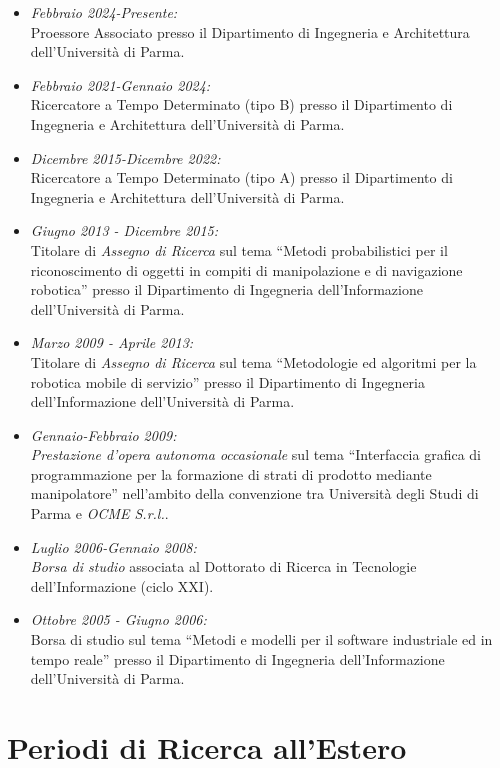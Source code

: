 \documentclass[11pt]{article}
\newcommand{\ITEMDATE}[1]{\item \textit{#1:}\\}
\begin{document}
\begin{itemize}
\ITEMDATE{Febbraio 2024-Presente} 
Proessore Associato presso il Dipartimento di Ingegneria e Architettura dell'Universit\`a di Parma.

\ITEMDATE{Febbraio 2021-Gennaio 2024} 
Ricercatore a Tempo Determinato (tipo B) presso il Dipartimento di Ingegneria e Architettura dell'Universit\`a di Parma.

\ITEMDATE{Dicembre 2015-Dicembre 2022} 
Ricercatore a Tempo Determinato (tipo A) presso il Dipartimento di Ingegneria e Architettura dell'Universit\`a di Parma.

\ITEMDATE{Giugno 2013 - Dicembre 2015} 
Titolare di \emph{Assegno di Ricerca} sul tema 
``Metodi probabilistici per il riconoscimento di oggetti in compiti di manipolazione e di navigazione robotica''
presso il Dipartimento di Ingegneria dell'Informazione dell'Universit\`a di Parma.

\ITEMDATE{Marzo 2009 - Aprile 2013} 
Titolare di \emph{Assegno di Ricerca} sul tema ``Metodologie ed algoritmi per la robotica mobile di servizio''
presso il Dipartimento di Ingegneria dell'Informazione dell'Universit\`a di Parma.

\ITEMDATE{Gennaio-Febbraio 2009} 
\emph{Prestazione d'opera autonoma occasionale} sul tema ``Interfaccia grafica di 
programmazione per la formazione di strati di prodotto mediante manipolatore'' 
nell'ambito della convenzione tra Universit\`a degli Studi di Parma e \emph{OCME S.r.l.}.

\ITEMDATE{Luglio 2006-Gennaio 2008} 
\emph{Borsa di studio} associata al Dottorato di Ricerca in Tecnologie dell'Informazione (ciclo XXI).

\ITEMDATE{Ottobre 2005 - Giugno 2006}
Borsa di studio sul tema ``Metodi e modelli per il software 
industriale ed in tempo reale'' presso %
il Dipartimento di Ingegneria dell'Informazione dell'Universit\`a di Parma.

\end{itemize}


\section*{Periodi di Ricerca all'Estero}
\end{document}
